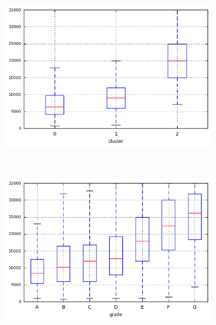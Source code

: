 \begin{anexosenv}
\begin{figure}[t!]
\end{figure}

\begin{figure}[t!]
    \centering
        \caption{\emph{Boxplots} de funded\textunderscore amnt\textunderscore inv }
        \begin{subfigure}[t]{0.45\textwidth}
 
            \centerline{\includegraphics[width=1\textwidth]{img/funded_amnt_inv_by_cluster}}
        \end{subfigure}%
        ~ 
        \begin{subfigure}[t]{0.45\textwidth}
            \centerline{\includegraphics[width=1\textwidth]{img/funded_amnt_inv_by_grade}}

        \end{subfigure}
        \\
                \caption{\emph{Boxplots} de installment}
        \begin{subfigure}[t]{0.45\textwidth}
            \centering


\end{subfigure}
\end{figure}
\end{anexosenv}
